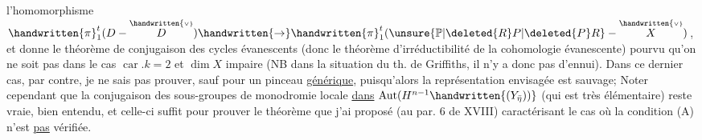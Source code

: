 l'homomorphisme $\handwritten{\pi}_1^t(D-\overset{\handwritten{\scriptscriptstyle\vee}}{D})\handwritten{\rightarrow}\handwritten{\pi}_1^t(\unsure{\mathbb{P}|\deleted{R}P|\deleted{P}R}-\overset{\handwritten{\scriptscriptstyle\vee}}{X})$, et donne le théorème de conjugaison des cycles évanescents (donc le théorème d'irréductibilité de la cohomologie évanescente) pourvu qu'on ne soit pas dans le cas $\operatorname{car}.k=2$ et $\dim X$ impaire (NB  dans la situation du th. de Griffiths, il n'y a donc pas d'ennui). Dans ce dernier cas, par contre, je ne sais  pas prouver, sauf pour un pinceau \uline{générique}, puisqu'alors la représentation envisagée est sauvage;  Noter cependant que la conjugaison des sous-groupes de monodromie locale \uline{dans} $\operatorname{Aut}(H^{n-1}\handwritten{(Y_{\bar{\eta}}))}$ (qui est très élémentaire) reste vraie, bien entendu, et celle-ci suffit pour prouver le théorème que j'ai proposé (au par. 6 de XVIII) caractérisant le cas où la condition (A) n'est \uline{pas} vérifiée.
